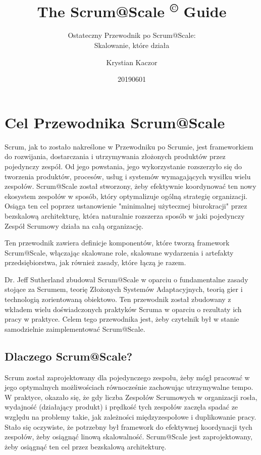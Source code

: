 \documentclass[12pt,a4paper,parskip=full]{scrartcl}
\title{\Huge{\color{red}\textbf{The Scrum@Scale 
\textsuperscript{\copyright} 
Guide}}}
\subtitle{\color{gray}Ostateczny Przewodnik po Scrum@Scale:\\ Skalowanie, które działa}
\author{Krystian Kaczor}
\date{20190601}
\begin{document}

\section{Cel Przewodnika Scrum@Scale}

Scrum, jak to zostało nakreślone w Przewodniku po Scrumie, jest frameworkiem do rozwijania, dostarczania i utrzymywania złożonych produktów przez pojedynczy zespół. Od jego powstania, jego wykorzystanie rozszerzyło się do tworzenia produktów, procesów, usług i systemów wymagających wysiłku wielu zespołów. Scrum@Scale został stworzony, żeby efektywnie koordynować ten nowy ekosystem zespołów w sposób, który optymalizuje ogólną strategię organizacji. Osiąga ten cel poprzez ustanowienie "minimalnej użytecznej biurokracji" przez bezskalową architekturę, która naturalnie rozszerza sposób w jaki pojedynczy Zespół Scrumowy działa na całą organizację.

Ten przewodnik zawiera definicje komponentów, które tworzą framework Scrum@Scale, włączając skalowane role, skalowane wydarzenia i artefakty przedsiębiorstwa, jak również zasady, które łączą je razem.

Dr. Jeff Sutherland zbudował Scrum@Scale w oparciu o fundamentalne zasady stojące za Scrumem, teorię Złożonych Systemów Adaptacyjnych, teorią gier i technologią zorientowaną obiektowo. Ten przewodnik został zbudowany z wkładem wielu doświadczonych praktyków Scruma w oparciu o rezultaty ich pracy w praktyce. Celem tego przewodnika jest, żeby czytelnik był w stanie samodzielnie zaimplementować Scrum@Scale.

\subsection{Dlaczego Scrum@Scale?}

Scrum został zaprojektowany dla pojedynczego zespołu, żeby mógł pracować w jego optymalnych możliwościach równocześnie zachowując utrzymywalne tempo. W praktyce, okazało się, że gdy liczba Zespołów Scrumowych w organizacji rosła, wydajność (działający produkt) i prędkość tych zespołów zaczęła spadać ze względu na problemy takie, jak zależności międzyzespołowe i duplikowanie pracy. Stało się oczywiste, że potrzebny był framework do efektywnej koordynacji tych zespołów, żeby osiągnąć linową skalowalność. Scrum@Scale jest zaprojektowany, żeby osiągnąć ten cel przez bezskalową architekturę.
\end{document}
